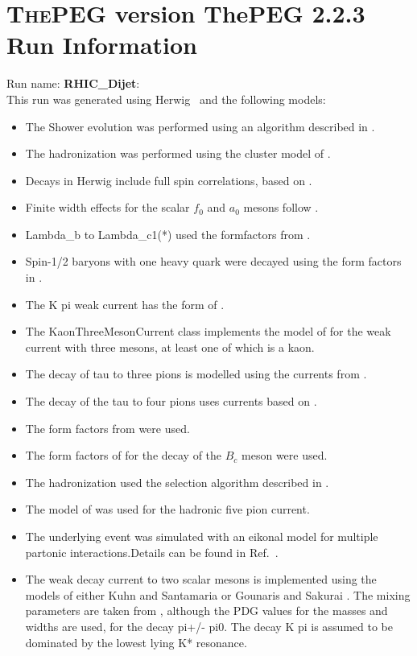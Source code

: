 \documentclass{article}
\begin{document}
\appendix
\section[xxx]{\textsc{ThePEG} version ThePEG 2.2.3 \cite{ThePEG} Run Information}
Run name: \textbf{RHIC_Dijet}:\\
This run was generated using Herwig~\cite{Bahr:2008pv} and the following models:
\begin{itemize}
\item The Shower evolution was performed using an algorithm described in \cite{Marchesini:1983bm,Marchesini:1987cf,Gieseke:2003rz,Bahr:2008pv}.
\item The hadronization was performed using the cluster model of \cite{Webber:1983if}.
\item Decays in Herwig include full spin correlations, based on \cite{Richardson:2001df}.
\item Finite width effects for the scalar $f_0$ and $a_0$ mesons follow \cite{Flatte:1976xu}.
\item Lambda_b to Lambda_c1(*) used the formfactors from \cite{Huang:2000xw}.
\item Spin-1/2 baryons with one heavy quark were decayed using the form factors in \cite{Singleton:1990ye}.
\item The K pi weak current has the form of \cite{Finkemeier:1996dh}.
\item The KaonThreeMesonCurrent class implements the model of \cite{Finkemeier:1995sr} for the weak current with three mesons, at least one of which is a kaon.
\item The decay of tau to three pions is modelled using the currents from \cite{Asner:1999kj}.
\item The decay of the tau to four pions uses currents based on \cite{Bondar:2002mw}.
\item The form factors from \cite{Ivanov:1996fj} were used.
\item The form factors of \cite{Kiselev:2002vz} for the decay of the $B_c$ meson were used.
\item The hadronization used the selection algorithm described in \cite{Kupco:1998fx}.
\item The model of \cite{Kuhn:2006nw} was used for the hadronic five pion current.
\item The underlying event was simulated with an eikonal model for multiple partonic interactions.Details can be found in Ref.~\cite{Bahr:2008dy,Bahr:2009ek}.
\item The weak decay current to two scalar mesons is implemented using the models of either Kuhn and Santamaria \cite{Kuhn:1990ad} or Gounaris and Sakurai \cite{Gounaris:1968mw}. The mixing parameters are taken from \cite{Asner:1999kj}, although the PDG values for the masses and widths are used, for the decay pi+/- pi0. The decay K pi is assumed to  be dominated by the lowest lying K* resonance.

\end{itemize}
\end{document}
